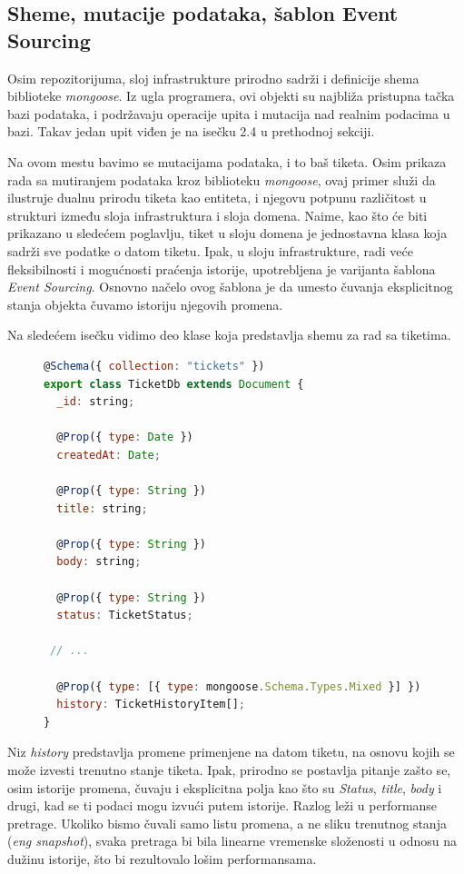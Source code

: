 \documentclass[12pt,oneside]{memoir}
\begin{document}
\newpage
\subsection{Sheme, mutacije podataka, šablon Event Sourcing}
Osim repozitorijuma, sloj infrastrukture prirodno sadrži i definicije shema biblioteke \textit{mongoose}. Iz ugla programera, ovi objekti su najbliža pristupna tačka bazi podataka, i podržavaju operacije upita i mutacija nad realnim podacima u bazi. Takav jedan upit viđen je na isečku 2.4 u prethodnoj sekciji.

Na ovom mestu bavimo se mutacijama podataka, i to baš tiketa. Osim prikaza rada sa mutiranjem podataka kroz biblioteku \textit{mongoose}, ovaj primer služi da ilustruje dualnu prirodu tiketa kao entiteta, i njegovu potpunu različitost u strukturi između sloja infrastruktura i sloja domena. Naime, kao što će biti prikazano u sledećem poglavlju, tiket u sloju domena je jednostavna klasa koja sadrži sve podatke o datom tiketu. Ipak, u sloju infrastrukture, radi veće fleksibilnosti i mogućnosti praćenja istorije, upotrebljena je varijanta šablona \textit{Event Sourcing}. Osnovno načelo ovog šablona je da umesto čuvanja eksplicitnog stanja objekta čuvamo istoriju njegovih promena.

Na sledećem isečku vidimo deo klase koja predstavlja shemu za rad sa tiketima.

\begin{figure}[h]
\begin{lstlisting}[language=JavaScript, style=ES6, caption={Fajl \textit{ticket.schema.ts}}]
@Schema({ collection: "tickets" })
export class TicketDb extends Document {
  _id: string;

  @Prop({ type: Date })
  createdAt: Date;

  @Prop({ type: String })
  title: string;

  @Prop({ type: String })
  body: string;

  @Prop({ type: String })
  status: TicketStatus;

 // ...

  @Prop({ type: [{ type: mongoose.Schema.Types.Mixed }] })
  history: TicketHistoryItem[];
}
\end{lstlisting}
\end{figure}


\newpage
Niz \textit{history} predstavlja promene primenjene na datom tiketu, na osnovu kojih se može izvesti trenutno stanje tiketa. Ipak, prirodno se postavlja pitanje zašto se, osim istorije promena, čuvaju i eksplicitna polja kao što su \textit{Status}, \textit{title}, \textit{body} i drugi, kad se ti podaci mogu izvući putem istorije. Razlog leži u performanse pretrage. Ukoliko bismo čuvali samo listu promena, a ne sliku trenutnog stanja (\textit{eng snapshot}), svaka pretraga bi bila linearne vremenske složenosti u odnosu na dužinu istorije, što bi rezultovalo lošim performansama.
\end{document}
